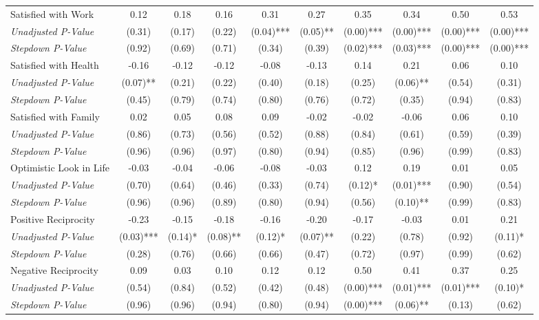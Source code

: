 \begin{tabular}{l c c c c c c c c c}
Satisfied with Work & 0.12 & 0.18 & 0.16 & 0.31 & 0.27 & 0.35 & 0.34 & 0.50 & 0.53 \\
\quad \textit{Unadjusted P-Value} & (0.31) & (0.17) & (0.22) & (0.04)*** & (0.05)** & (0.00)*** & (0.00)*** & (0.00)*** & (0.00)*** \\
\quad \textit{Stepdown P-Value} & (0.92) & (0.69) & (0.71) & (0.34) & (0.39) & (0.02)*** & (0.03)*** & (0.00)*** & (0.00)*** \\
Satisfied with Health & -0.16 & -0.12 & -0.12 & -0.08 & -0.13 & 0.14 & 0.21 & 0.06 & 0.10 \\
\quad \textit{Unadjusted P-Value} & (0.07)** & (0.21) & (0.22) & (0.40) & (0.18) & (0.25) & (0.06)** & (0.54) & (0.31) \\
\quad \textit{Stepdown P-Value} & (0.45) & (0.79) & (0.74) & (0.80) & (0.76) & (0.72) & (0.35) & (0.94) & (0.83) \\
Satisfied with Family & 0.02 & 0.05 & 0.08 & 0.09 & -0.02 & -0.02 & -0.06 & 0.06 & 0.10 \\
\quad \textit{Unadjusted P-Value} & (0.86) & (0.73) & (0.56) & (0.52) & (0.88) & (0.84) & (0.61) & (0.59) & (0.39) \\
\quad \textit{Stepdown P-Value} & (0.96) & (0.96) & (0.97) & (0.80) & (0.94) & (0.85) & (0.96) & (0.99) & (0.83) \\
Optimistic Look in Life & -0.03 & -0.04 & -0.06 & -0.08 & -0.03 & 0.12 & 0.19 & 0.01 & 0.05 \\
\quad \textit{Unadjusted P-Value} & (0.70) & (0.64) & (0.46) & (0.33) & (0.74) & (0.12)* & (0.01)*** & (0.90) & (0.54) \\
\quad \textit{Stepdown P-Value} & (0.96) & (0.96) & (0.89) & (0.80) & (0.94) & (0.56) & (0.10)** & (0.99) & (0.83) \\
Positive Reciprocity & -0.23 & -0.15 & -0.18 & -0.16 & -0.20 & -0.17 & -0.03 & 0.01 & 0.21 \\
\quad \textit{Unadjusted P-Value} & (0.03)*** & (0.14)* & (0.08)** & (0.12)* & (0.07)** & (0.22) & (0.78) & (0.92) & (0.11)* \\
\quad \textit{Stepdown P-Value} & (0.28) & (0.76) & (0.66) & (0.66) & (0.47) & (0.72) & (0.97) & (0.99) & (0.62) \\
Negative Reciprocity & 0.09 & 0.03 & 0.10 & 0.12 & 0.12 & 0.50 & 0.41 & 0.37 & 0.25 \\
\quad \textit{Unadjusted P-Value} & (0.54) & (0.84) & (0.52) & (0.42) & (0.48) & (0.00)*** & (0.01)*** & (0.01)*** & (0.10)* \\
\quad \textit{Stepdown P-Value} & (0.96) & (0.96) & (0.94) & (0.80) & (0.94) & (0.00)*** & (0.06)** & (0.13) & (0.62) \\
\bottomrule
\end{tabular}

